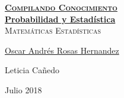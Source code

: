 \documentclass[12pt, fleqn]{report}                             %
\author{Oscar Andrés Rosas}                                     %
\theoremstyle{break}                                            %
\begin{document}
\begin{titlepage}
    
    \pagecolor{TitlePageColor}                                      %
    \color{white}                                                   %

    \vspace                                                         %
    \baselineskip                                                   %

    \makebox[0pt][l]{\rule{1.3\textwidth}{3pt}}                     %
    
    \href{https://compilandoconocimiento.com}                       %
    {\textbf{\textsc{\Huge Compilando Conocimiento}}}\\[2.7cm]      %

    \href{\ProjectNameLink}                                         %
    {\fontsize{36}{50}                                              %
        \selectfont \textbf{Probabilidad y Estadística}}\\[0.5cm]   %
    \textcolor{ColorSubtext}                                        %
        {\textsc{\LARGE Matemáticas Estadísticas}}                  %
    
    \vfill                                                          %
    
    \href{https://compilandoconocimiento.com/nosotros}              %
    {\LARGE \textsf{Oscar Andrés Rosas Hernandez}}                  %

    \LARGE \textsf{Leticia Cañedo}                                  %

    \vspace                                                         %
    \baselineskip                                                   %
    
    {\large \textsf{Julio 2018}}                                    %

\end{titlepage}
\end{document}
